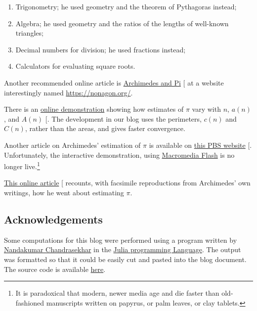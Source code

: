 \documentclass[
  a4paper,
]{article}
\begin{document}
\begin{enumerate}
\item
  Trigonometry; he used geometry and the theorem of Pythagoras instead;
\item
  Algebra; he used geometry and the ratios of the lengths of well-known
  triangles;
\item
  Decimal numbers for division; he used fractions instead;
\item
  Calculators for evaluating square roots.
\end{enumerate}

Another recommended online article is
\href{https://nonagon.org/ExLibris/archimedes-pi}{Archimedes and Pi}
{[}\citeproc{ref-bertrand2014}{1}{]} at a website interestingly named
\url{https://nonagon.org/}.

There is an
\href{https://demonstrations.wolfram.com/ArchimedesApproximationOfPi/\#more}{online
demonstration} showing how estimates of \(\pi\) vary with \(n\),
\(a(n)\), and \(A(n)\) {[}\citeproc{ref-tucker2009}{10}{]}. The
development in our blog uses the perimeters, \(c(n)\) and \(C(n)\),
rather than the areas, and gives faster convergence.

Another article on Archimedes' estimation of \(\pi\) is available on
\href{ttps://www.pbs.org/wgbh/nova/physics/approximating-pi.html}{this
PBS website} {[}\citeproc{ref-groleau2003}{11}{]}. Unfortunately, the
interactive demonstration, using
\href{https://en.wikipedia.org/wiki/Adobe_Flash}{Macromedia Flash} is no
longer live.\footnote{It is paradoxical that modern, newer media age and
  die faster than old-fashioned manuscripts written on papyrus, or palm
  leaves, or clay tablets.}

\href{https://mathsciencehistory.com/2019/10/01/archimedes-and-his-pi-the-great-numerical-hope/}{This
online article} {[}\citeproc{ref-birchak2019}{12}{]} recounts, with
facsimile reproductions from Archimedes' own writings, how he went about
estimating \(\pi\).

\subsection{Acknowledgements}\label{acknowledgements}

Some computations for this blog were performed using a program written
by
\href{https://www.linkedin.com/in/nandakumar-chandrasekhar-a400b45b/}{Nandakumar
Chandrasekhar} in the \href{https://julialang.org/}{Julia programming
Language}. The output was formatted so that it could be easily cut and
pasted into the blog document. The source code is available
\href{auxiliary/pi_approximations.jl}{here}.
\end{document}
